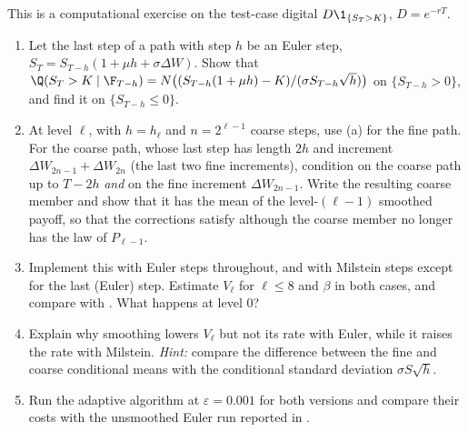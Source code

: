\begin{exercise}\label{ex:ml-smoothing}
\medium This is a computational exercise on the test-case digital $D\1_{\{S_T>K\}}$, $D=e^{-rT}$.
\begin{enumerate}[label=(\alph*)]
  \item Let the last step of a path with step $h$ be an Euler step,
    $S_T=S_{T-h}(1+\mu h+\sigma\Delta W)$. Show that
    $\Q(S_T>K\mid\F_{T-h})=N\big((S_{T-h}(1+\mu h)-K)/(\sigma S_{T-h}\sqrt h)\big)$ on
    $\{S_{T-h}>0\}$, and find it on $\{S_{T-h}\le0\}$.
  \item At level $\ell$, with $h=h_\ell$ and $n=2^{\ell-1}$ coarse steps, use (a) for the fine path.
    For the coarse path, whose last step has length $2h$ and increment
    $\Delta W_{2n-1}+\Delta W_{2n}$ (the last two fine increments), condition on the coarse path up to $T-2h$
    \emph{and} on the fine increment $\Delta W_{2n-1}$. Write the resulting coarse member and show
    that it has the mean of the level-$(\ell-1)$ smoothed payoff, so that the corrections satisfy
     although the coarse member no longer has the law of $P_{\ell-1}$.
  \item Implement this with Euler steps throughout, and with Milstein steps except for the last
    (Euler) step. Estimate $V_\ell$ for $\ell\le8$ and $\beta$ in both cases, and compare with
    . What happens at level $0$?
  \item Explain why smoothing lowers $V_\ell$ but not its rate with Euler, while it raises the rate
    with Milstein. \emph{Hint:} compare the difference between the fine and coarse conditional means
    with the conditional standard deviation $\sigma S\sqrt h$.
  \item Run the adaptive algorithm at $\varepsilon=0.001$ for both versions and compare their costs
    with the unsmoothed Euler run reported in .
\end{enumerate}
\end{exercise}

